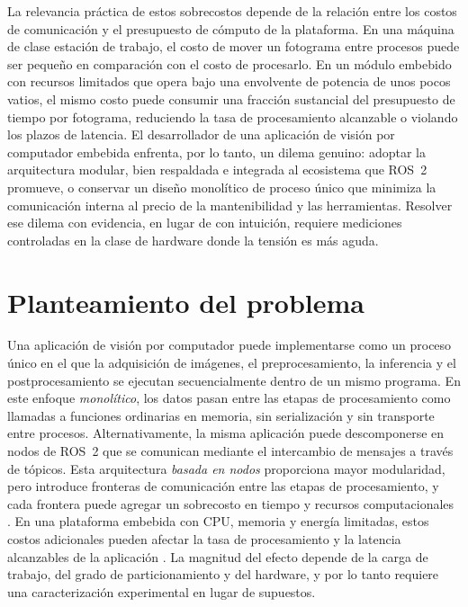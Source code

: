 La relevancia práctica de estos sobrecostos depende de la relación entre
los costos de comunicación y el presupuesto de cómputo de la plataforma. En
una máquina de clase estación de trabajo, el costo de mover un fotograma
entre procesos puede ser pequeño en comparación con el costo de procesarlo.
En un módulo embebido con recursos limitados que opera bajo una envolvente
de potencia de unos pocos vatios, el mismo costo puede consumir una fracción
sustancial del presupuesto de tiempo por fotograma, reduciendo la tasa de
procesamiento alcanzable o violando los plazos de latencia. El desarrollador
de una aplicación de visión por computador embebida enfrenta, por lo tanto,
un dilema genuino: adoptar la arquitectura modular, bien respaldada e
integrada al ecosistema que ROS~2 promueve, o conservar un diseño monolítico
de proceso único que minimiza la comunicación interna al precio de la
mantenibilidad y las herramientas. Resolver ese dilema con evidencia, en
lugar de con intuición, requiere mediciones controladas en la clase de
hardware donde la tensión es más aguda.

\section{Planteamiento del problema}
\label{sec:problem-statement}

Una aplicación de visión por computador puede implementarse como un proceso
único en el que la adquisición de imágenes, el preprocesamiento, la
inferencia y el postprocesamiento se ejecutan secuencialmente dentro de un
mismo programa. En este enfoque \emph{monolítico}, los datos pasan entre las
etapas de procesamiento como llamadas a funciones ordinarias en memoria, sin
serialización y sin transporte entre procesos. Alternativamente, la misma
aplicación puede descomponerse en nodos de ROS~2 que se comunican mediante
el intercambio de mensajes a través de tópicos. Esta arquitectura
\emph{basada en nodos} proporciona mayor modularidad, pero introduce
fronteras de comunicación entre las etapas de procesamiento, y cada frontera
puede agregar un sobrecosto en tiempo y recursos computacionales
\cite{maruyama2016, kronauer2021, kamiya2025, luo2025}. En una plataforma
embebida con CPU, memoria y energía limitadas, estos costos adicionales
pueden afectar la tasa de procesamiento y la latencia alcanzables de la
aplicación \cite{kronauer2021, macenski2023}. La magnitud del efecto depende
de la carga de trabajo, del grado de particionamiento y del hardware, y por
lo tanto requiere una caracterización experimental en lugar de supuestos.

